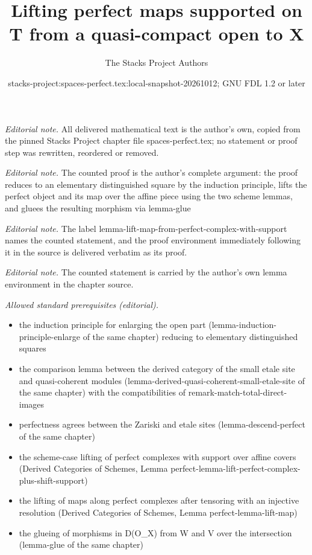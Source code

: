 \documentclass[10pt,a4paper]{amsart}
\title{Lifting perfect maps supported on T from a quasi-compact open to X}
\author{The Stacks Project Authors}
\date{stacks-project:spaces-perfect.tex:local-snapshot-20261012; GNU FDL 1.2 or later}
\theoremstyle{plain}
\theoremstyle{definition}
\theoremstyle{remark}
\numberwithin{equation}{subsection}
\begin{document}
\maketitle
\noindent\textit{Editorial note.} All delivered mathematical text is the author's own, copied from the pinned Stacks Project chapter file spaces-perfect.tex; no statement or proof step was rewritten, reordered or removed.\par\medskip
\noindent\textit{Editorial note.} The counted proof is the author's complete argument: the proof reduces to an elementary distinguished square by the induction principle, lifts the perfect object and its map over the affine piece using the two scheme lemmas, and gluees the resulting morphism via lemma-glue\par\medskip
\noindent\textit{Editorial note.} The label lemma-lift-map-from-perfect-complex-with-support names the counted statement, and the proof environment immediately following it in the source is delivered verbatim as its proof.\par\medskip
\noindent\textit{Editorial note.} The counted statement is carried by the author's own lemma environment in the chapter source.\par\medskip
\noindent\textit{Allowed standard prerequisites (editorial).}\begin{itemize}
\item the induction principle for enlarging the open part (lemma-induction-principle-enlarge of the same chapter) reducing to elementary distinguished squares
\item the comparison lemma between the derived category of the small etale site and quasi-coherent modules (lemma-derived-quasi-coherent-small-etale-site of the same chapter) with the compatibilities of remark-match-total-direct-images
\item perfectness agrees between the Zariski and etale sites (lemma-descend-perfect of the same chapter)
\item the scheme-case lifting of perfect complexes with support over affine covers (Derived Categories of Schemes, Lemma perfect-lemma-lift-perfect-complex-plus-shift-support)
\item the lifting of maps along perfect complexes after tensoring with an injective resolution (Derived Categories of Schemes, Lemma perfect-lemma-lift-map)
\item the glueing of morphisms in D(O\_X) from W and V over the intersection (lemma-glue of the same chapter)
\end{itemize}\medskip
\end{document}
